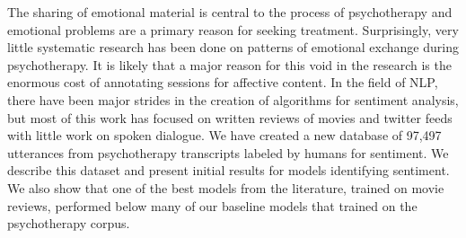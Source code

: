 The sharing of emotional material is central to the process of psychotherapy and emotional problems are a primary reason for seeking treatment. Surprisingly, very little systematic research has been done on patterns of emotional exchange during psychotherapy.  It is likely that a major reason for this void in the research is the enormous cost of annotating sessions for affective content.  In the field of NLP, there have been major strides in the creation of algorithms for sentiment analysis, but most of this work has focused on written reviews of movies and twitter feeds with little work on spoken dialogue.  We have created a new database of 97,497 utterances from psychotherapy transcripts labeled by humans for sentiment.  We describe this dataset and present initial results for models identifying sentiment. We also show that one of the best models from the literature, trained on movie reviews, performed below many of our baseline models that trained on the psychotherapy corpus.
